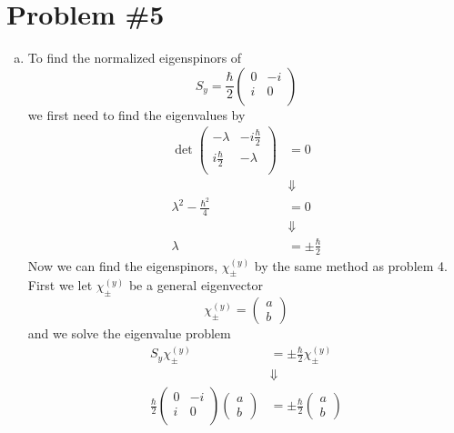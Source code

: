 \documentclass[11pt]{article}
\numberwithin{equation}{section}
\begin{document}
\section{Problem \#5}
\begin{enumerate}[(a)]
\item
To find the normalized eigenspinors of 
$$S_y = \frac{\hbar}{2}\left(\begin{array}{cc}
                              0   &-i\\
                              i   &0 \\
                       \end{array}\right)$$
we first need to find the eigenvalues by
\begin{align*}
\det\left(\begin{array}{cc}
          -\lambda   &-i\frac{\hbar}{2}\\
          i\frac{\hbar}{2}   &-\lambda \\
     \end{array}\right) &= 0\\
&\Downarrow\\
\lambda^2 - \frac{\hbar^2}{4} &= 0\\
&\Downarrow\\
\lambda &= \pm\frac{\hbar}{2} 
\end{align*}
Now we can find the eigenspinors, $\chi^{(y)}_{\pm}$ by the same method as problem 4. First we let $\chi^{(y)}_{\pm}$ be a general eigenvector
$$\chi^{(y)}_{\pm} = \left(\begin{array}{c}a\\ b\end{array}\right)$$
and we solve the eigenvalue problem
\begin{align*}
S_y\chi^{(y)}_{\pm} &= \pm\frac{\hbar}{2}\chi^{(y)}_{\pm}\\
&\Downarrow\\
\frac{\hbar}{2}\left(\begin{array}{cc}
                      0   &-i\\  
                      i   &0 \\
               \end{array}\right)\left(\begin{array}{c}a\\ b\end{array}\right)
     &= \pm\frac{\hbar}{2}\left(\begin{array}{c}a\\ b\end{array}\right)\\

\end{align*}
\end{enumerate}
\end{document}
